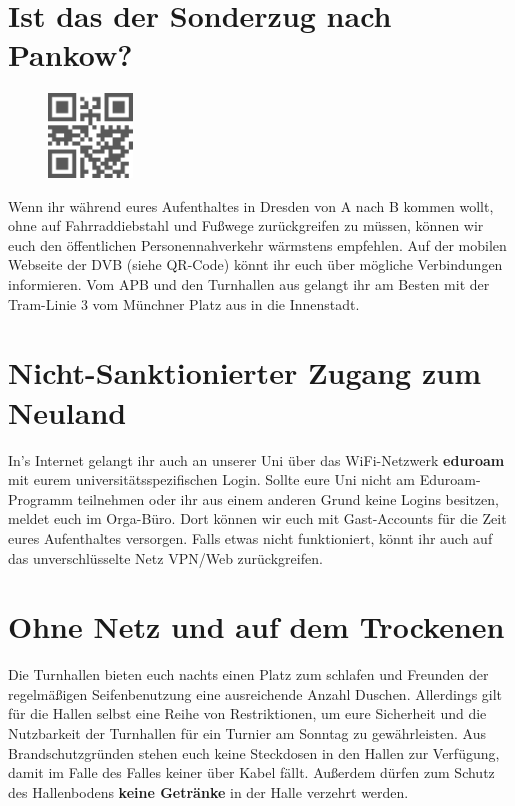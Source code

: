 \section*{Ist das der Sonderzug nach Pankow?}

\begin{figure}
  \vspace{-12pt}
  \begin{centering}
    \includegraphics[width=0.2\textwidth,keepaspectratio]{img/dvb_mobil.png}
  \end{centering}
  \vspace{-15pt}
\end{figure}

Wenn ihr während eures Aufenthaltes in Dresden von A nach B kommen wollt, ohne auf Fahrraddiebstahl und Fußwege zurückgreifen zu müssen, können wir euch den öffentlichen Personennahverkehr wärmstens empfehlen.
Auf der mobilen Webseite der DVB (siehe QR-Code) könnt ihr euch über mögliche Verbindungen informieren.
Vom APB und den Turnhallen aus gelangt ihr am Besten mit der Tram-Linie 3 vom Münchner Platz aus in die Innenstadt.

\section*{Nicht-Sanktionierter Zugang zum Neuland}

In's Internet gelangt ihr auch an unserer Uni über das WiFi-Netzwerk \textbf{eduroam} mit eurem universitätsspezifischen Login.
Sollte eure Uni nicht am Eduroam-Programm teilnehmen oder ihr aus einem anderen Grund keine Logins besitzen, meldet euch im Orga-Büro.
Dort können wir euch mit Gast-Accounts für die Zeit eures Aufenthaltes versorgen.
Falls etwas nicht funktioniert, könnt ihr auch auf das unverschlüsselte Netz VPN/Web zurückgreifen.

\section*{Ohne Netz und auf dem Trockenen}

Die Turnhallen bieten euch nachts einen Platz zum schlafen und Freunden der regelmäßigen Seifenbenutzung eine ausreichende Anzahl Duschen.
Allerdings gilt für die Hallen selbst eine Reihe von Restriktionen, um eure Sicherheit und die Nutzbarkeit der Turnhallen für ein Turnier am Sonntag zu gewährleisten.
Aus Brandschutzgründen stehen euch keine Steckdosen in den Hallen zur Verfügung, damit im Falle des Falles keiner über Kabel fällt.
Außerdem dürfen zum Schutz des Hallenbodens \textbf{keine Getränke} in der Halle verzehrt werden.

